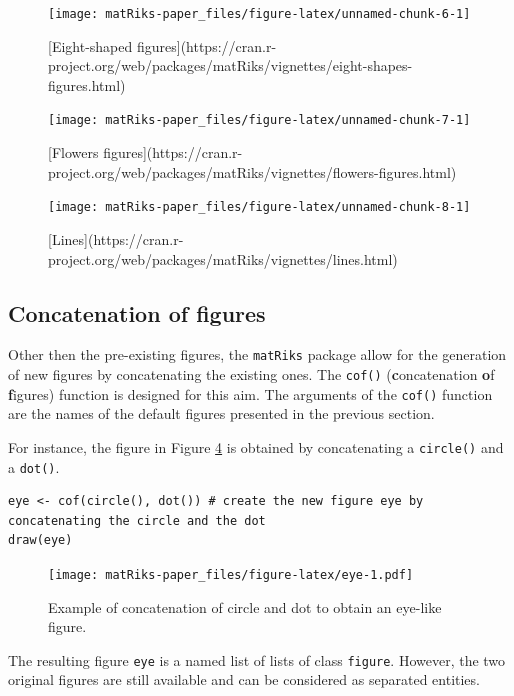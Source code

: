 \begin{figure}
\texttt{[image: matRiks-paper\_files/figure-latex/unnamed-chunk-6-1]} \caption{[Eight-shaped figures](https://cran.r-project.org/web/packages/matRiks/vignettes/eight-shapes-figures.html)}\label{fig:unnamed-chunk-6}
\end{figure}

\begin{figure}
\texttt{[image: matRiks-paper\_files/figure-latex/unnamed-chunk-7-1]} \caption{[Flowers figures](https://cran.r-project.org/web/packages/matRiks/vignettes/flowers-figures.html)}\label{fig:unnamed-chunk-7}
\end{figure}

\begin{figure}
\texttt{[image: matRiks-paper\_files/figure-latex/unnamed-chunk-8-1]} \caption{[Lines](https://cran.r-project.org/web/packages/matRiks/vignettes/lines.html)}\label{fig:unnamed-chunk-8}
\end{figure}

\hypertarget{concatenation-of-figures}{%
\subsection{Concatenation of figures}\label{concatenation-of-figures}}

Other then the pre-existing figures, the \texttt{matRiks} package allow for the generation of new figures by concatenating the existing ones. The \texttt{cof()} (\textbf{c}oncatenation \textbf{o}f \textbf{f}igures) function is designed for this aim. The arguments of the \texttt{cof()} function are the names of the default figures presented in the previous section.

For instance, the figure in Figure \ref{fig:eye} is obtained by concatenating a \texttt{circle()} and a \texttt{dot()}.

\begin{verbatim}
eye <- cof(circle(), dot()) # create the new figure eye by concatenating the circle and the dot
draw(eye)
\end{verbatim}

\begin{figure}
\centering
\texttt{[image: matRiks-paper\_files/figure-latex/eye-1.pdf]}
\caption{\label{fig:eye}Example of concatenation of circle and dot to obtain an eye-like figure.}
\end{figure}

The resulting figure \texttt{eye} is a named list of lists of class \texttt{figure}. However, the two original figures are still available and can be considered as separated entities.

